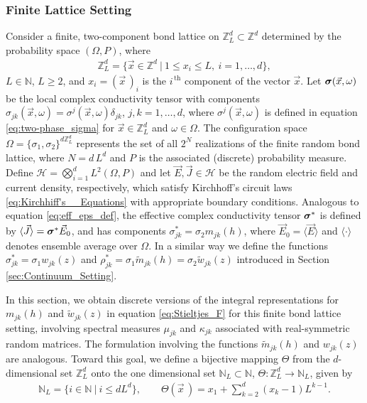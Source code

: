 \documentclass{cmslatex}
\newcommand\bsig{\mbox{\boldmath${\sigma}$}}
\begin{document}
\subsubsection{Finite Lattice Setting}
\label{sec:Finite_Lattice_Setting}
%
Consider a finite, two-component bond lattice on
$\mathbb{Z}_L^d\subset\mathbb{Z}^d$ determined by the probability space
$(\Omega,P)$, where
%
\begin{align}\label{eq:ZLd}
  \mathbb{Z}_L^d=\{\vec{x}\in\mathbb{Z}^d \ | \ 1\leq x_i\leq L, \ i=1,\ldots,d\},   
\end{align}
%
$L\in\mathbb{N}$, $L\geq2$, and $x_i=(\vec{x}\,)_i$ is the $i^{\,\text{th}}$
component of the vector $\vec{x}$. Let $\bsig(\vec{x},\omega)$ be the local
complex conductivity tensor with components
$\sigma_{jk}(\vec{x},\omega)=\sigma^j(\vec{x},\omega)\delta_{jk}$, $j,k=1,\ldots,d$, where
$\sigma^j(\vec{x},\omega)$ is defined in equation \eqref{eq:two-phase_sigma} for
$\vec{x}\in \mathbb{Z}_L^d$ and $\omega\in\Omega$. The configuration space
$\Omega=\{\sigma_1,\sigma_2\}^{d\mathbb{Z}_L^d}$ represents the set of all $2^N$
realizations of the finite random bond lattice, where $N=d\,L^d$ and
$P$ is the associated (discrete) probability measure. Define
$\mathscr{H}=\bigotimes_{i=1}^dL^2(\Omega,P)$ and let
$\vec{E},\vec{J}\in \mathscr{H}$ be the random
electric field and current density, respectively, which satisfy
Kirchhoff's circuit laws \eqref{eq:Kirchhiff's__Equations} with
appropriate boundary conditions. Analogous to equation 
\eqref{eq:eff_eps_def}, the effective complex conductivity tensor
$\bsig^*$ is defined by $\langle\vec{J}\rangle=\bsig^*\vec{E}_0$, and
has components $\sigma_{jk}^*=\sigma_2m_{jk}(h)$, where $\vec{E}_0=\langle\vec{E}\rangle$ and
$\langle\cdot\rangle$ denotes ensemble average over $\Omega$. In a similar way we define
the functions $\sigma_{jk}^*=\sigma_1w_{jk}(z)$ and
$\rho^*_{jk}=\sigma_1\tilde{m}_{jk}(h)=\sigma_2\tilde{w}_{jk}(z)$ introduced in
Section \ref{sec:Continuum_Setting}.  




In this section, we obtain discrete versions of the integral
representations for $m_{jk}(h)$ and $\tilde{w}_{jk}(z)$ in equation 
\eqref{eq:Stieltjes_F} for this finite bond lattice setting, involving
spectral measures $\mu_{jk}$ and $\kappa_{jk}$ associated with real-symmetric
random matrices. The formulation involving the functions
$\tilde{m}_{jk}(h)$ and $w_{jk}(z)$ are analogous. Toward this goal,
we define a bijective mapping $\Theta$ from the $d$-dimensional set
$\mathbb{Z}_L^d$ onto the one dimensional set
$\mathbb{N}_L\subset\mathbb{N}$, $\Theta:\mathbb{Z}_L^d\to\mathbb{N}_L$, given by
% 
\begin{align}\label{eq:Bijection_Z_N}
  \mathbb{N}_L=\{i\in\mathbb{N} \ | \ i\leq dL^d\}, \qquad
  \Theta(\vec{x}\,)=x_1+\sum_{k=2}^d(x_k-1)L^{k-1}.
\end{align}
%
\end{document}
